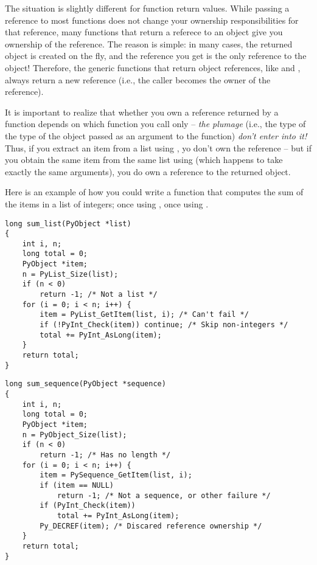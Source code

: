 The situation is slightly different for function return values.  
While passing a reference to most functions does not change your 
ownership responsibilities for that reference, many functions that 
return a referece to an object give you ownership of the reference.
The reason is simple: in many cases, the returned object is created 
on the fly, and the reference you get is the only reference to the 
object!  Therefore, the generic functions that return object 
references, like  and 
, always return a new reference (i.e., the 
caller becomes the owner of the reference).

It is important to realize that whether you own a reference returned 
by a function depends on which function you call only -- \emph{the 
plumage} (i.e., the type of the type of the object passed as an 
argument to the function) \emph{don't enter into it!}  Thus, if you 
extract an item from a list using , yo don't 
own the reference -- but if you obtain the same item from the same 
list using  (which happens to take exactly 
the same arguments), you do own a reference to the returned object.

Here is an example of how you could write a function that computes the 
sum of the items in a list of integers; once using 
, once using .

\begin{verbatim}
long sum_list(PyObject *list)
{
    int i, n;
    long total = 0;
    PyObject *item;
    n = PyList_Size(list);
    if (n < 0)
        return -1; /* Not a list */
    for (i = 0; i < n; i++) {
        item = PyList_GetItem(list, i); /* Can't fail */
        if (!PyInt_Check(item)) continue; /* Skip non-integers */
        total += PyInt_AsLong(item);
    }
    return total;
}
\end{verbatim}

\begin{verbatim}
long sum_sequence(PyObject *sequence)
{
    int i, n;
    long total = 0;
    PyObject *item;
    n = PyObject_Size(list);
    if (n < 0)
        return -1; /* Has no length */
    for (i = 0; i < n; i++) {
        item = PySequence_GetItem(list, i);
        if (item == NULL)
            return -1; /* Not a sequence, or other failure */
        if (PyInt_Check(item))
            total += PyInt_AsLong(item);
        Py_DECREF(item); /* Discared reference ownership */
    }
    return total;
}
\end{verbatim}

